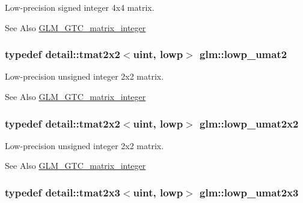 Low-\/precision signed integer 4x4 matrix. \begin{DoxySeeAlso}{See Also}
\hyperlink{group__gtc__matrix__integer}{G\-L\-M\-\_\-\-G\-T\-C\-\_\-matrix\-\_\-integer} 
\end{DoxySeeAlso}
\hypertarget{group__gtc__matrix__integer_ga09df85e6b5e53f66a86d042e0633bfbc}{
\subsubsection[{lowp\-\_\-umat2}]{\setlength{\rightskip}{0pt plus 5cm}typedef detail\-::tmat2x2$<$uint, lowp$>$ {\bf glm\-::lowp\-\_\-umat2}}}\label{group__gtc__matrix__integer_ga09df85e6b5e53f66a86d042e0633bfbc}
Low-\/precision unsigned integer 2x2 matrix. \begin{DoxySeeAlso}{See Also}
\hyperlink{group__gtc__matrix__integer}{G\-L\-M\-\_\-\-G\-T\-C\-\_\-matrix\-\_\-integer} 
\end{DoxySeeAlso}
\hypertarget{group__gtc__matrix__integer_gaa4dfe67706187e459004b9a6c500b048}{
\subsubsection[{lowp\-\_\-umat2x2}]{\setlength{\rightskip}{0pt plus 5cm}typedef detail\-::tmat2x2$<$uint, lowp$>$ {\bf glm\-::lowp\-\_\-umat2x2}}}\label{group__gtc__matrix__integer_gaa4dfe67706187e459004b9a6c500b048}
Low-\/precision unsigned integer 2x2 matrix. \begin{DoxySeeAlso}{See Also}
\hyperlink{group__gtc__matrix__integer}{G\-L\-M\-\_\-\-G\-T\-C\-\_\-matrix\-\_\-integer} 
\end{DoxySeeAlso}
\hypertarget{group__gtc__matrix__integer_ga4c8388c4a03f228c0e12dd7b7445115d}{
\subsubsection[{lowp\-\_\-umat2x3}]{\setlength{\rightskip}{0pt plus 5cm}typedef detail\-::tmat2x3$<$uint, lowp$>$ {\bf glm\-::lowp\-\_\-umat2x3}}}\label{group__gtc__matrix__integer_ga4c8388c4a03f228c0e12dd7b7445115d}
